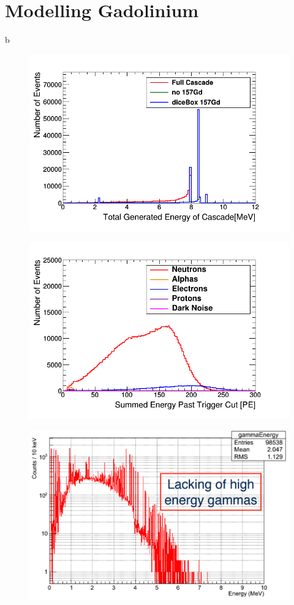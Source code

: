 \section{Modelling Gadolinium}\label{sec:geant4Simulation_modellingGadolinium}
b

\begin{figure}[H]
 \centering
 \includegraphics[width=0.7\linewidth]{Chapter4/Figs/Raster/gadolinium/TotalGeneratedEnergyOfCascadeFinalStateDicebox.png}
 \label{fig:TotalGeneratedEnergyOfCascadeFinalStateDicebox}
\end{figure}

\begin{figure}[H]
 \centering
 \includegraphics[width=0.7\linewidth]{Chapter4/Figs/Raster/gadolinium/summedEnergyPastTriggerGdDicebox.png}
 \label{fig:photonEvaporationGd}
\end{figure}

\begin{figure}[H]
 \centering
 \includegraphics[width=0.7\linewidth]{Chapter4/Figs/Raster/gadolinium/photonEvaporationGd.png}
 \label{fig:photonEvaporationGd}
\end{figure}


